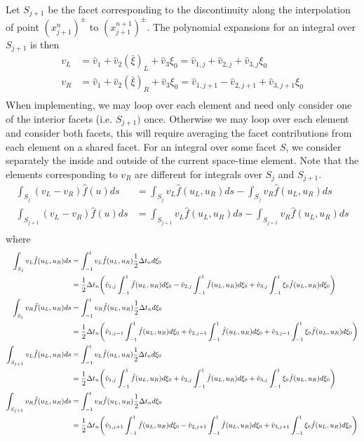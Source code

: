 \documentclass[11pt, oneside]{article}   	%
\begin{document}
Let $S_{j+1}$ be the facet corresponding to the discontinuity along the interpolation of point $(x_{j+1}^{n})^\pm$ to $(x_{j+1}^{n+1})^\pm$.
The polynomial expansions for an integral over $S_{j+1}$ is then
\[\begin{split}
v_L &= \hat{v}_1 + \hat{v}_2 (\bar{\xi})_L + \hat{v}_3 \xi_0 = \hat{v}_{1,j} + \hat{v}_{2,j} + \hat{v}_{3,j} \xi_0\\
v_R &= \hat{v}_1 + \hat{v}_2 (\bar{\xi})_R + \hat{v}_3 \xi_0 = \hat{v}_{1,j+1} - \hat{v}_{2,j+1} + \hat{v}_{3,j+1} \xi_0\\
\end{split}\]
When implementing, we may loop over each element and need only consider one of the interior facets (i.e. $S_{j+1})$ once.
Otherwise we may loop over each element and consider both facets, this will require averaging the facet contributions from each element on a shared facet.
For an integral over some facet $S$, we consider separately the inside and outside of the current space-time element.
Note that the elements corresponding to $v_R$ are different for integrals over $S_j$ and $S_{j+1}$.
\begin{equation}\label{S_integral}
\begin{split}
\int_{S_j} (v_L - v_R) \hat{f}(u)ds 
&= \int_{S_j} v_L \hat{f}(u_L,u_R)ds - \int_{S_j} v_R \hat{f}(u_L,u_R)ds\\
\int_{S_{j+1}} (v_L - v_R) \hat{f}(u)ds
&= \int_{S_{j+1}} v_L \hat{f}(u_L,u_R)ds - \int_{S_{j+1}} v_R \hat{f}(u_L,u_R)ds\\
\end{split}
\end{equation}
where
\[\small\begin{split}
\int_{S_j} v_L \hat{f}(u_L,u_R)ds
&= \int_{-1}^1 v_L \hat{f}(u_L,u_R)\frac{1}{2}\Delta t_n d\xi_0\\
&= \frac{1}{2}\Delta t_n \bigg( \hat{v}_{1,j}\int_{-1}^1\hat{f}(u_L,u_R)d\xi_0
		- \hat{v}_{2,j}\int_{-1}^1\hat{f}(u_L,u_R)d\xi_0
		+ \hat{v}_{3,j}\int_{-1}^1\xi_0\hat{f}(u_L,u_R)d\xi_0 \bigg)\\
\int_{S_j} v_R \hat{f}(u_L,u_R)ds
&= \int_{-1}^1 v_R \hat{f}(u_L,u_R)\frac{1}{2}\Delta t_n d\xi_0\\
&= \frac{1}{2}\Delta t_n \bigg( \hat{v}_{1,j-1}\int_{-1}^1\hat{f}(u_L,u_R)d\xi_0
		+ \hat{v}_{2,j-1}\int_{-1}^1\hat{f}(u_L,u_R)d\xi_0
		+ \hat{v}_{3,j-1}\int_{-1}^1\xi_0\hat{f}(u_L,u_R)d\xi_0 \bigg)\\
\int_{S_{j+1}} v_L \hat{f}(u_L,u_R)ds
&= \int_{-1}^1 v_L \hat{f}(u_L,u_R)\frac{1}{2}\Delta t_n d\xi_0\\
&= \frac{1}{2}\Delta t_n \bigg( \hat{v}_{1,j}\int_{-1}^1\hat{f}(u_L,u_R)d\xi_0
		+ \hat{v}_{2,j}\int_{-1}^1\hat{f}(u_L,u_R)d\xi_0
		+ \hat{v}_{3,j}\int_{-1}^1\xi_0\hat{f}(u_L,u_R)d\xi_0 \bigg)\\
\int_{S_{j+1}} v_R \hat{f}(u_L,u_R)ds
&= \int_{-1}^1 v_R \hat{f}(u_L,u_R)\frac{1}{2}\Delta t_n d\xi_0\\
&= \frac{1}{2}\Delta t_n \bigg( \hat{v}_{1,j+1}\int_{-1}^1\hat{f}(u_L,u_R)d\xi_0
		- \hat{v}_{2,j+1}\int_{-1}^1\hat{f}(u_L,u_R)d\xi_0
		+ \hat{v}_{3,j+1}\int_{-1}^1\xi_0\hat{f}(u_L,u_R)d\xi_0 \bigg)\\
\end{split}\]
\end{document}
